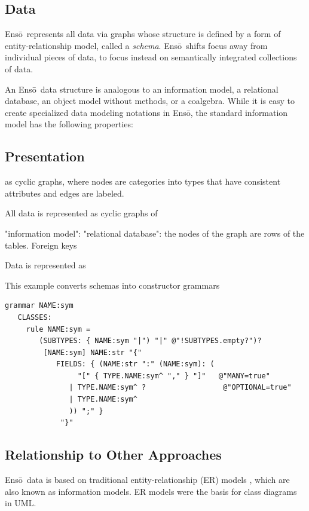 \documentclass[11pt]{article}
\newcommand{\Enso}{Ens\={o}}
\begin{document}
\subsection{Data}

\Enso\ represents all data via graphs whose structure is defined
by a form of entity-relationship model, called a \textit{schema}. 
\Enso\ shifts focus away from individual pieces of data, to focus instead
on semantically integrated collections of data. 

An \Enso\ data structure is analogous to an information model,
a relational database, an object model without methods, or a coalgebra.
While it is easy to create specialized data modeling notations
in \Enso, the standard information model has the following properties:

\subsection{Presentation}






as cyclic graphs, where
nodes are categories into types that have 
consistent attributes and edges are labeled.

All data is represented as cyclic graphs of 


"information model": 
"relational database": the nodes of the graph are
rows of the tables. Foreign keys 

Data is represented as 



This example converts schemas into constructor grammars
\begin{verbatim}
grammar NAME:sym
   CLASSES:
     rule NAME:sym = 
        (SUBTYPES: { NAME:sym "|") "|" @"!SUBTYPES.empty?")?
         [NAME:sym] NAME:str "{" 
            FIELDS: { (NAME:str ":" (NAME:sym): (
                 "[" { TYPE.NAME:sym^ "," } "]"   @"MANY=true"
               | TYPE.NAME:sym^ ?                  @"OPTIONAL=true"
               | TYPE.NAME:sym^
               )) ";" }
             "}"
\end{verbatim}

\subsection{Relationship to Other Approaches}
\label{relatedwork}

\Enso\ data is based on traditional 
entity-relationship (ER) models \cite{FOO},
which are also known as information models. 
ER models were the basis for class diagrams in UML.
\end{document}

